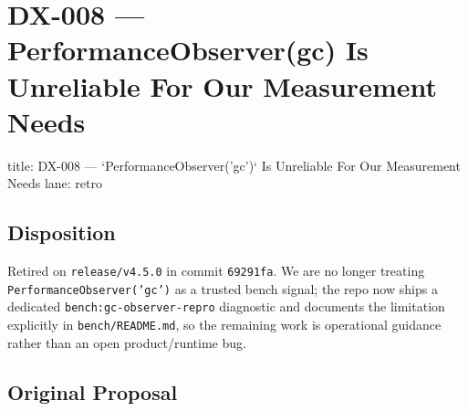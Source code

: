 \chapter{DX-008 --- PerformanceObserver(\textquotesingle gc\textquotesingle) Is Unreliable For Our Measurement Needs}\label{record-310}

\smallskip

\begin{RecordMeta}
title: DX-008 — `PerformanceObserver('gc')` Is Unreliable For Our Measurement Needs
lane: retro

\end{RecordMeta}

\section{Disposition}\label{record-310-disposition}

Retired on \texttt{r\allowbreak{}e\allowbreak{}l\allowbreak{}e\allowbreak{}a\allowbreak{}s\allowbreak{}e\allowbreak{}/\allowbreak{}v\allowbreak{}4\allowbreak{}.\allowbreak{}5\allowbreak{}.\allowbreak{}0} in commit \texttt{6\allowbreak{}9\allowbreak{}2\allowbreak{}9\allowbreak{}1\allowbreak{}f\allowbreak{}a}. We are no longer treating \texttt{P\allowbreak{}e\allowbreak{}r\allowbreak{}f\allowbreak{}o\allowbreak{}r\allowbreak{}m\allowbreak{}a\allowbreak{}n\allowbreak{}c\allowbreak{}e\allowbreak{}O\allowbreak{}b\allowbreak{}s\allowbreak{}e\allowbreak{}r\allowbreak{}v\allowbreak{}e\allowbreak{}r\allowbreak{}(\allowbreak{}'\allowbreak{}g\allowbreak{}c\allowbreak{}'\allowbreak{})} as a trusted bench signal; the repo now ships a dedicated \texttt{b\allowbreak{}e\allowbreak{}n\allowbreak{}c\allowbreak{}h\allowbreak{}:\allowbreak{}g\allowbreak{}c\allowbreak{}-\allowbreak{}o\allowbreak{}b\allowbreak{}s\allowbreak{}e\allowbreak{}r\allowbreak{}v\allowbreak{}e\allowbreak{}r\allowbreak{}-\allowbreak{}r\allowbreak{}e\allowbreak{}p\allowbreak{}r\allowbreak{}o} diagnostic and documents the limitation explicitly in \texttt{b\allowbreak{}e\allowbreak{}n\allowbreak{}c\allowbreak{}h\allowbreak{}/\allowbreak{}R\allowbreak{}E\allowbreak{}A\allowbreak{}D\allowbreak{}M\allowbreak{}E\allowbreak{}.\allowbreak{}m\allowbreak{}d}, so the remaining work is operational guidance rather than an open product/runtime bug.

\section{Original Proposal}\label{record-310-original-proposal}

